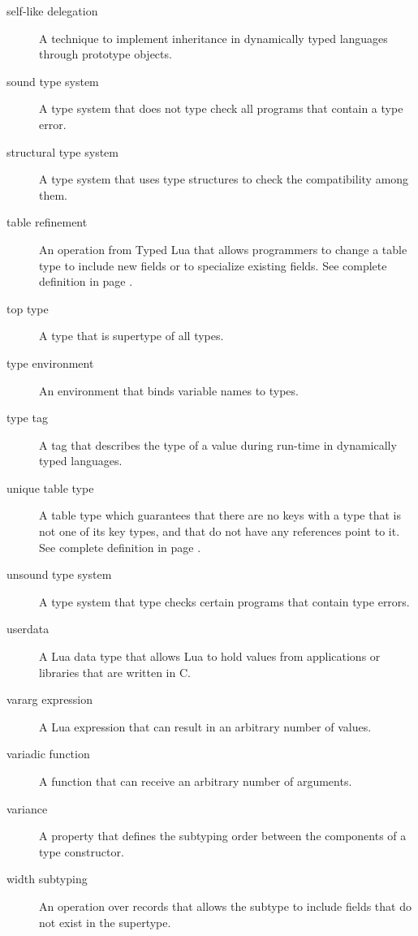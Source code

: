 \begin{description}
\item[self-like delegation] A technique to implement inheritance in dynamically typed
languages through prototype objects.

\item[sound type system] A type system that does not type check all programs that contain a type error.

\item[structural type system] A type system that uses type structures to check the compatibility among them.

\item[table refinement] An operation from Typed Lua that allows programmers to change a table type
to include new fields or to specialize existing fields.
See complete definition in page \pageref{sec:refinement}.

\item[top type] A type that is supertype of all types.

\item[type environment] An environment that binds variable names to types.

\item[type tag] A tag that describes the type of a value during run-time in dynamically
typed languages.

\item[unique table type] A table type which guarantees that there are no
keys with a type that is not one of its key types, and that do not have
any references point to it.
See complete definition in page \pageref{def:tabletype}.

\item[unsound type system] A type system that type checks certain programs that contain type errors.

\item[userdata] A Lua data type that allows Lua to hold values from applications
or libraries that are written in C.

\item[vararg expression] A Lua expression that can result in an arbitrary number of values.

\item[variadic function] A function that can receive an arbitrary number of arguments.

\item[variance] A property that defines the subtyping order between the components
of a type constructor.

\item[width subtyping] An operation over records that allows the subtype to include
fields that do not exist in the supertype.

\end{description}
